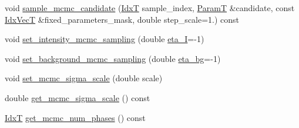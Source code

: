 \begin{DoxyCompactItemize}
\item 
void \hyperlink{classmappel_1_1MCMCAdaptor2D_aef447869a01890c2895227bf6e110dea}{sample\+\_\+mcmc\+\_\+candidate} (\hyperlink{namespacemappel_ab17ec0f30b61ece292439d7ece81d3a8}{IdxT} sample\+\_\+index, \hyperlink{classmappel_1_1PointEmitterModel_a665ec6aea3aac139bb69a23c06d4b9a1}{ParamT} \&candidate, const \hyperlink{namespacemappel_ac63743dcd42180127307cd0e4ecdd784}{Idx\+VecT} \&fixed\+\_\+parameters\+\_\+mask, double step\+\_\+scale=1.) const 
\item 
void \hyperlink{classmappel_1_1MCMCAdaptor1D_ac70f768928859b1e9449b0ec1a141c4c}{set\+\_\+intensity\+\_\+mcmc\+\_\+sampling} (double \hyperlink{classmappel_1_1MCMCAdaptor1D_a5780d326be0c40e10d6c91777cfffbd3}{eta\+\_\+I}=-\/1)
\item 
void \hyperlink{classmappel_1_1MCMCAdaptor1D_ae79ee3845fbdd0e378f00eeebf8ccef1}{set\+\_\+background\+\_\+mcmc\+\_\+sampling} (double \hyperlink{classmappel_1_1MCMCAdaptor1D_af54c93421b8e298289cbb92743c6b3d5}{eta\+\_\+bg}=-\/1)
\item 
void \hyperlink{classmappel_1_1MCMCAdaptorBase_aa6b8eea136bf1f34f0c50bf8d1937a58}{set\+\_\+mcmc\+\_\+sigma\+\_\+scale} (double scale)
\item 
double \hyperlink{classmappel_1_1MCMCAdaptorBase_a9de5ee52bbf5c8fd3c1e3bd00836801a}{get\+\_\+mcmc\+\_\+sigma\+\_\+scale} () const 
\item 
\hyperlink{namespacemappel_ab17ec0f30b61ece292439d7ece81d3a8}{IdxT} \hyperlink{classmappel_1_1MCMCAdaptorBase_adb9997f1dc774f3a169c61cdb730a85f}{get\+\_\+mcmc\+\_\+num\+\_\+phases} () const 
\end{DoxyCompactItemize}
